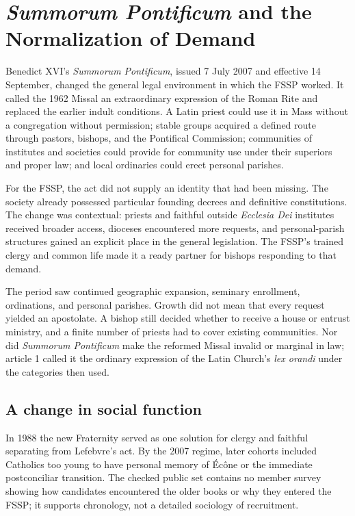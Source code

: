 \section{\emph{Summorum Pontificum} and the Normalization of Demand}

Benedict XVI's \emph{Summorum Pontificum}, issued 7 July 2007 and effective 14 September, changed the general legal environment in which the FSSP worked. It called the 1962 Missal an extraordinary expression of the Roman Rite and replaced the earlier indult conditions. A Latin priest could use it in Mass without a congregation without permission; stable groups acquired a defined route through pastors, bishops, and the Pontifical Commission; communities of institutes and societies could provide for community use under their superiors and proper law; and local ordinaries could erect personal parishes.

For the FSSP, the act did not supply an identity that had been missing. The society already possessed particular founding decrees and definitive constitutions. The change was contextual: priests and faithful outside \emph{Ecclesia Dei} institutes received broader access, dioceses encountered more requests, and personal-parish structures gained an explicit place in the general legislation. The FSSP's trained clergy and common life made it a ready partner for bishops responding to that demand.

The period saw continued geographic expansion, seminary enrollment, ordinations, and personal parishes. Growth did not mean that every request yielded an apostolate. A bishop still decided whether to receive a house or entrust ministry, and a finite number of priests had to cover existing communities. Nor did \emph{Summorum Pontificum} make the reformed Missal invalid or marginal in law; article 1 called it the ordinary expression of the Latin Church's \emph{lex orandi} under the categories then used.

\subsection{A change in social function}

In 1988 the new Fraternity served as one solution for clergy and faithful separating from Lefebvre's act. By the 2007 regime, later cohorts included Catholics too young to have personal memory of Écône or the immediate postconciliar transition. The checked public set contains no member survey showing how candidates encountered the older books or why they entered the FSSP; it supports chronology, not a detailed sociology of recruitment.

